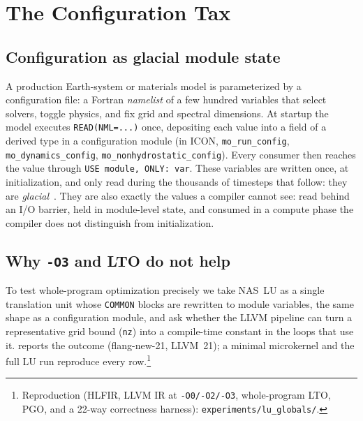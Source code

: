 \section{The Configuration Tax}
\label{sec:background}

\subsection{Configuration as glacial module state}
A production Earth-system or materials model is parameterized by a configuration file: a Fortran \emph{namelist} of a few hundred variables that select solvers, toggle physics, and fix grid and spectral dimensions. At startup the model executes \lstinline[style=fortran]|READ(NML=...)| once, depositing each value into a field of a derived type in a configuration module (in ICON, \texttt{mo\_run\_config}, \texttt{mo\_dynamics\_config}, \texttt{mo\_nonhydrostatic\_config}). Every consumer then reaches the value through \lstinline[style=fortran]|USE module, ONLY: var|. These variables are written once, at initialization, and only read during the thousands of timesteps that follow: they are \emph{glacial}~\cite{glacial}. They are also exactly the values a compiler cannot see: read behind an I/O barrier, held in module-level state, and consumed in a compute phase the compiler does not distinguish from initialization.

\subsection{Why \texttt{-O3} and LTO do not help}
\label{sec:whycompilers}
To test whole-program optimization precisely we take NAS~LU as a single translation unit whose \texttt{COMMON} blocks are rewritten to module variables, the same shape as a configuration module, and ask whether the LLVM pipeline can turn a representative grid bound (\texttt{nz}) into a compile-time constant in the loops that use it.  reports the outcome (flang-new-21, LLVM~21); a minimal microkernel and the full LU run reproduce every row.\footnote{Reproduction (HLFIR, LLVM IR at \texttt{-O0/-O2/-O3}, whole-program LTO, PGO, and a 22-way correctness harness): \texttt{experiments/lu\_globals/}.}

